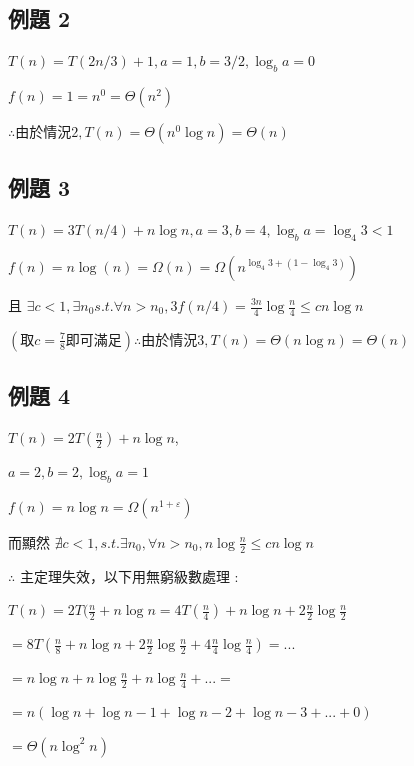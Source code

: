 \documentclass[10pt,UTF8]{ctexart}
\begin{document}
\subsection{例題 2}

$T(n) = T(2n /3) + 1, a = 1, b = 3/2, \log_b a = 0$

$f(n) = 1 = n^{0} = \Theta(n^{2})$

$\therefore 由於情況 2, T(n) = \Theta(n^{0} \log n) = \Theta(n) $

\subsection{例題 3}

$T(n) = 3T(n/4) + n\log n, a = 3, b = 4, \log_b a = \log_4 3 < 1$

$f(n) = n\log(n) = \Omega(n) = \Omega(n^{\log_4 3 + (1 - \log_4 3)})$

且 $\exists c < 1, \exists n_{0}  s.t. \forall n > n_{0}, 3f(n/4) = \frac{3n}{4}\log {\frac{n}{4}} \leq cn\log n$

$(取 c = \frac{7}{8} 即可滿足) \therefore 由於情況 3, T(n) = \Theta(n \log n) = \Theta(n) $

\subsection{例題 4}

$T(n) = 2T( \frac{n}{2}) + n \log n $,

$ a = 2, b = 2, \log_b a = 1$

$f(n) = n \log n = \Omega(n^{1+\varepsilon})$

而顯然 $ \nexists c < 1, s.t. \exists n_{0}, \forall n > n_{0}, n \log \frac{n}{2} \leq c n \log n$

$ \therefore $ 主定理失效，以下用無窮級數處理 : 

$ T(n) = 2T(\frac{n}{2} + n \log n = 4T (\frac{n}{4}) + n \log n + 2 \frac{n}{2} \log \frac{n}{2} $

$ = 8T(\frac{n}{8} + n \log n + 2 \frac{n}{2} \log \frac {n}{2} + 4 \frac{n}{4} \log \frac{n}{4}) = ... $

$ = n \log n + n \log \frac{n}{2} + n \log \frac {n}{4} + ... =  $

$ = n (  \log n + \log n - 1 + \log n - 2 + \log n - 3 + ... + 0 ) $

$ = \Theta(n \log^{2} n) $













\clearpage
\end{document}
